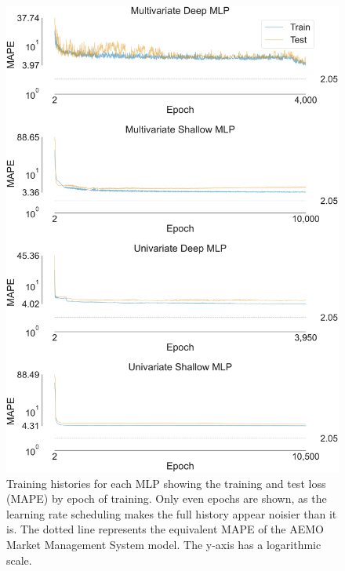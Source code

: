 \documentclass[mstat,12pt]{unswthesis}
\begin{document}
\begin{figure}[H]
\centerline{\includegraphics[width=\columnwidth]{Figures/Plots/MLP training histories.pdf}}
\caption{Training histories for each MLP showing the training and test loss (MAPE) by epoch of training. Only even epochs are shown, as the learning rate scheduling makes the full history appear noisier than it is. The dotted line represents the equivalent MAPE of the AEMO Market Management System model. The y-axis has a logarithmic scale.}
\label{mlp_hists}
\end{figure}
\end{document}
